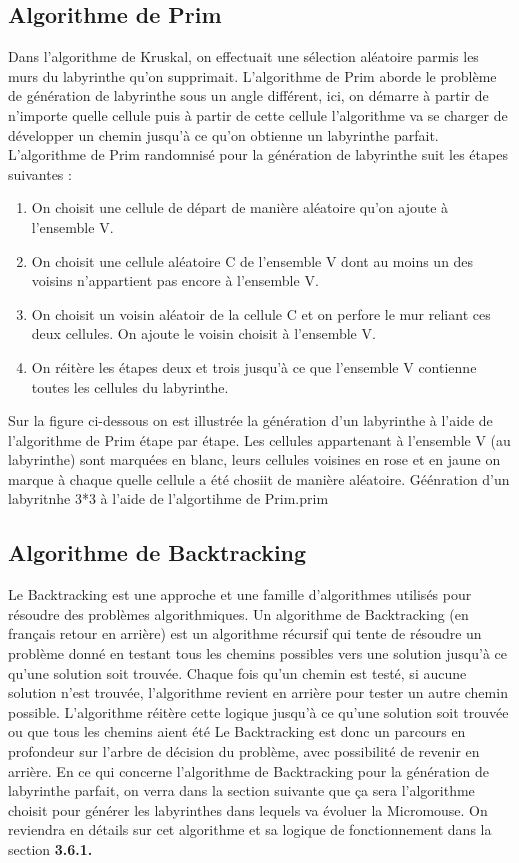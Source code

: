 \subsection{Algorithme de Prim}
Dans l'algorithme de Kruskal, on effectuait une sélection aléatoire parmis les murs du labyrinthe qu'on supprimait. L'algorithme de Prim aborde le problème de génération de labyrinthe sous un angle différent, ici, on démarre à partir de n'importe quelle cellule puis à partir de cette cellule l'algorithme va se charger de développer un chemin jusqu'à ce qu'on obtienne un labyrinthe parfait.
L'algorithme de Prim randomnisé pour la génération de labyrinthe suit les étapes suivantes :

\begin{enumerate}
    \item On choisit une cellule de départ de manière aléatoire qu'on ajoute à l'ensemble V.
    \item On choisit une cellule aléatoire C de l'ensemble V dont au moins un des voisins n'appartient pas encore à l'ensemble V. 
    \item On choisit un voisin aléatoir de la cellule C et on perfore le mur reliant ces deux cellules. On ajoute le voisin choisit à l'ensemble V. 
    \item On réitère les étapes deux et trois jusqu'à ce que l'ensemble V contienne toutes les cellules du labyrinthe.
\end{enumerate}
\newpage
Sur la figure ci-dessous on est illustrée la génération d'un labyrinthe à l'aide de l'algorithme de Prim étape par étape. Les cellules appartenant à l'ensemble V (au labyrinthe) sont marquées en blanc, leurs cellules voisines en rose et en jaune on marque à chaque quelle cellule a été chosiit de manière aléatoire.
{Géénration d'un labyritnhe 3*3 à l'aide de l'algortihme de Prim.}{prim}

\subsection{Algorithme de Backtracking}
Le Backtracking est une approche et une famille d'algorithmes utilisés pour résoudre des problèmes algorithmiques.
Un algorithme de Backtracking (en français retour en arrière) est un algorithme récursif qui tente de résoudre un problème donné en testant tous les chemins possibles vers une solution jusqu'à ce qu'une solution soit trouvée. 
Chaque fois qu'un chemin est testé, si aucune solution n'est trouvée, l'algorithme revient en arrière pour tester un autre chemin possible. L'algorithme réitère cette logique jusqu'à ce qu'une solution soit trouvée ou que tous les chemins aient été Le Backtracking est donc un parcours en profondeur sur l'arbre de décision du problème, avec possibilité de revenir en arrière. En ce qui concerne l'algorithme de Backtracking pour la génération de labyrinthe parfait, on verra dans la section suivante que ça sera l'algorithme choisit pour générer les labyrinthes dans lequels va évoluer la Micromouse. On reviendra en détails sur cet algorithme et sa logique de fonctionnement dans la section \textbf{3.6.1.}

